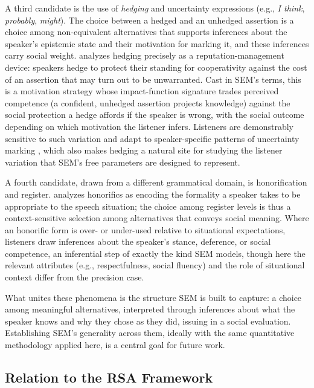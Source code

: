 \documentclass[12pt,a4paper]{article}
\begin{document}
A third candidate is the use of \emph{hedging} and uncertainty expressions (e.g.,
\emph{I think}, \emph{probably}, \emph{might}). The choice between a hedged and an
unhedged assertion is a choice among non-equivalent alternatives that supports
inferences about the speaker's epistemic state and their motivation for marking
it, and these inferences carry social weight. \citet{mccready2015} analyzes
hedging precisely as a reputation-management device: speakers hedge to protect
their standing for cooperativity against the cost of an assertion that may turn
out to be unwarranted. Cast in SEM's terms, this is a motivation strategy whose
impact-function signature trades perceived competence (a confident, unhedged
assertion projects knowledge) against the social protection a hedge affords if
the speaker is wrong, with the social outcome depending on which motivation the
listener infers. Listeners are demonstrably sensitive to such variation and adapt
to speaker-specific patterns of uncertainty marking \citep{schusterdegen2020},
which also makes hedging a natural site for studying the listener variation that
SEM's free parameters are designed to represent.

A fourth candidate, drawn from a different grammatical domain, is honorification
and register. \citet{mccready2019} analyzes honorifics as encoding the formality
a speaker takes to be appropriate to the speech situation; the choice among
register levels is thus a context-sensitive selection among alternatives that
conveys social meaning. Where an honorific form is over- or under-used relative to
situational expectations, listeners draw inferences about the speaker's stance,
deference, or social competence, an inferential step of exactly the kind SEM
models, though here the relevant attributes (e.g., respectfulness, social
fluency) and the role of situational context differ from the precision case.

What unites these phenomena is the structure SEM is built to capture: a choice
among meaningful alternatives, interpreted through inferences about what the
speaker knows and why they chose as they did, issuing in a social evaluation.
Establishing SEM's generality across them, ideally with the same quantitative
methodology applied here, is a central goal for future work.

\subsection{Relation to the RSA Framework}
\end{document}
